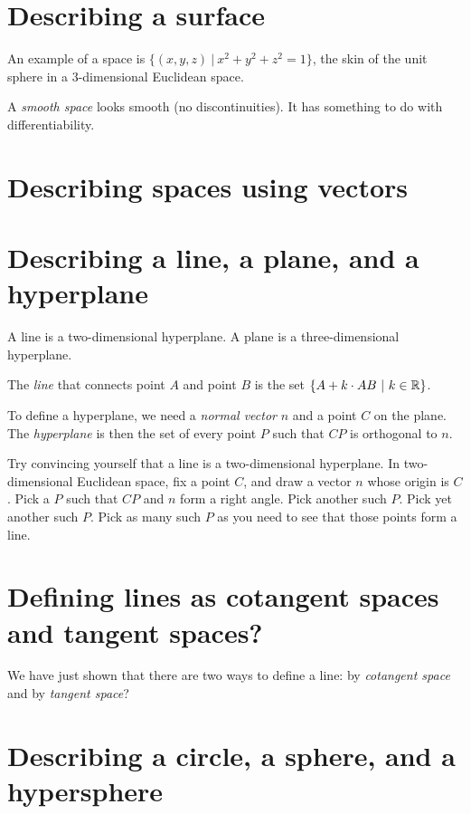 \section*{Describing a surface}

An example of a space is \( \{ (x,y,z) ~|~ x^2+y^2+z^2 = 1 \} \), the skin of the unit sphere in a 3-dimensional Euclidean space.

A \emph{smooth space} looks smooth (no discontinuities).
It has something to do with differentiability.

\section*{Describing spaces using vectors}

\section*{Describing a line, a plane, and a hyperplane}

A line is a two-dimensional hyperplane.
A plane is a three-dimensional hyperplane.

The \emph{line} that connects point \(A\) and point \(B\) is the set
\( \{ A + k \cdot AB ~|~ k \in \mathbb{R} \} \).

To define a hyperplane, we need a \emph{normal vector} \(n\) and a point \(C\) on the plane.
The \emph{hyperplane} is then the set of every point \(P\) such that \(CP\) is orthogonal to \(n\).

Try convincing yourself that a line is a two-dimensional hyperplane.
In two-dimensional Euclidean space, fix a point \(C\),
and draw a vector \(n\) whose origin is \(C\).
Pick a \(P\) such that \(CP\) and \(n\) form a right angle.
Pick another such \(P\).
Pick yet another such \(P\).
Pick as many such \(P\) as you need to see that those points form a line.

\section*{Defining lines as cotangent spaces and tangent spaces?}

We have just shown that there are two ways to define a line:
by \emph{cotangent space} and by \emph{tangent space}?

\section*{Describing a circle, a sphere, and a hypersphere}

